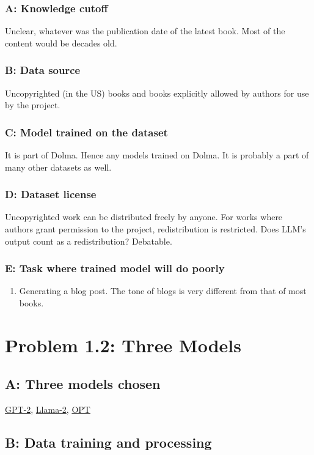 \documentclass[11pt]{article}
\begin{document}
\subsubsection{A: Knowledge cutoff}
\label{sec:org9a9eb65}
Unclear, whatever was the publication date of the latest book. Most of the content would be decades old.
\subsubsection{B: Data source}
\label{sec:orgfb35e62}
Uncopyrighted (in the US) books and books explicitly allowed by authors for use by the project.
\subsubsection{C: Model trained on the dataset}
\label{sec:orga23531c}
It is part of Dolma. Hence any models trained on Dolma. It is probably a part of many other datasets as well.
\subsubsection{D: Dataset license}
\label{sec:org3870a95}
Uncopyrighted work can be distributed freely by anyone. For works where authors grant permission to the project, redistribution is restricted. Does LLM's output count as a redistribution? Debatable.
\subsubsection{E: Task where trained model will do poorly}
\label{sec:org706643a}
\begin{enumerate}
\item Generating a blog post. The tone of blogs is very different from that of most books.
\end{enumerate}

\section{Problem 1.2: Three Models}
\label{sec:org3f7f3d3}
\subsection{A: Three models chosen}
\label{sec:orgf0870b2}
\href{https://huggingface.co/openai-community/gpt2}{GPT-2}, \href{https://huggingface.co/meta-llama/Llama-2-7b}{Llama-2}, \href{https://huggingface.co/facebook/opt-2.7b}{OPT}
\subsection{B: Data training and processing}
\label{sec:orgde65536}
\end{document}
